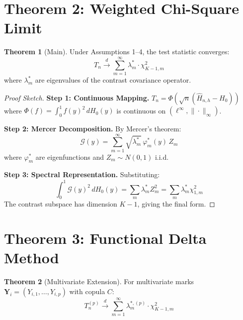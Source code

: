\documentclass[final,3p,twocolumn,times,authoryear]{elsarticle}
\theoremstyle{definition}
\newtheorem{theorem}{Theorem}[section]
\begin{document}
\section{Theorem 2: Weighted Chi-Square Limit}
\label{sec:theorem2}

\begin{theorem}[Main]
\label{thm:chisq}
Under Assumptions 1--4, the test statistic converges:
\begin{equation}
T_n \stackrel{d}{\longrightarrow} \sum_{m=1}^\infty \lambda_m^* \cdot \chi^2_{K-1,m}
\end{equation}
where $\lambda_m^*$ are eigenvalues of the contrast covariance operator.
\end{theorem}

\begin{proof}[Proof Sketch]

\textbf{Step 1: Continuous Mapping.} $T_n = \Phi(\sqrt{n}(\hat{H}_{n,h} - H_0))$ where $\Phi(f) = \int_0^1 f(y)^2 \, dH_0(y)$ is continuous on $(\ell^\infty, \|\cdot\|_\infty)$.

\textbf{Step 2: Mercer Decomposition.} By Mercer's theorem:
\begin{equation}
\mathcal{G}(y) = \sum_{m=1}^\infty \sqrt{\lambda_m^*} \, \varphi_m^*(y) \, Z_m
\end{equation}
where $\varphi_m^*$ are eigenfunctions and $Z_m \sim N(0,1)$ i.i.d.

\textbf{Step 3: Spectral Representation.} Substituting:
\begin{equation}
\int_0^1 \mathcal{G}(y)^2 \, dH_0(y) = \sum_m \lambda_m^* Z_m^2 = \sum_m \lambda_m^* \chi^2_{1,m}
\end{equation}
The contrast subspace has dimension $K-1$, giving the final form.
\end{proof}

\section{Theorem 3: Functional Delta Method}
\label{sec:theorem3}

\begin{theorem}[Multivariate Extension]
\label{thm:delta}
For multivariate marks $\mathbf{Y}_i = (Y_{i,1}, \dots, Y_{i,p})$ with copula $C$:
\begin{equation}
T_n^{(p)} \stackrel{d}{\longrightarrow} \sum_{m=1}^\infty \lambda_m^{*,(p)} \cdot \chi^2_{K-1,m}
\end{equation}
\end{theorem}
\end{document}
